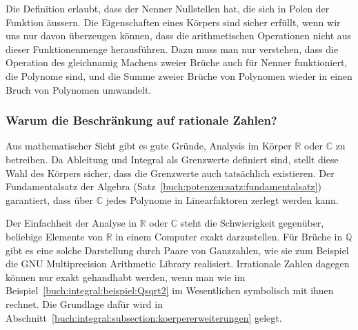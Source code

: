 Die Definition erlaubt, dass der Nenner Nullstellen hat, die sich in
Polen der Funktion äussern.
Die Eigenschaften eines Körpers sind sicher erfüllt, wenn wir uns
nur davon überzeugen können,
dass die arithmetischen Operationen nicht aus dieser Funktionenmenge
herausführen.
Dazu muss man nur verstehen, dass die Operation des gleichnamig Machens 
zweier Brüche auch für Nenner funktioniert, die Polynome sind, und die
Summe zweier Brüche von Polynomen wieder in einen Bruch von Polynomen
umwandelt.

%
%
\subsubsection{Warum die Beschränkung auf rationale Zahlen?}
Aus mathematischer Sicht gibt es gute Gründe, Analysis im Körper $\mathbb{R}$
oder $\mathbb{C}$ zu betreiben.
Da Ableitung und Integral als Grenzwerte definiert sind, stellt diese
Wahl des Körpers sicher, dass die Grenzwerte auch tatsächlich existieren.
Der Fundamentalsatz der Algebra
(Satz~\ref{buch:potenzen:satz:fundamentalsatz})
garantiert, dass über $\mathbb{C}$
jedes Polynome in Linearfaktoren zerlegt werden kann.

Der Einfachheit der Analyse in $\mathbb{R}$ oder $\mathbb{C}$ steht
die Schwierigkeit gegenüber, beliebige Elemente von $\mathbb{R}$ in
einem Computer exakt darzustellen.
Für Brüche in $\mathbb{Q}$ gibt es eine solche Darstellung durch
Paare von Ganzzahlen, wie sie zum Beispiel die GNU Multiprecision
Arithmetic Library \cite{buch:gmp} realisiert.
Irrationale Zahlen dagegen können nur exakt gehandhabt werden, wenn
man wie im Beispiel~\ref{buch:integral:beispiel:Qsqrt2}
im Wesentlichen symbolisch mit ihnen rechnet. 
Die Grundlage dafür wird in
Abschnitt~\ref{buch:integral:subsection:koerpererweiterungen}
gelegt.



